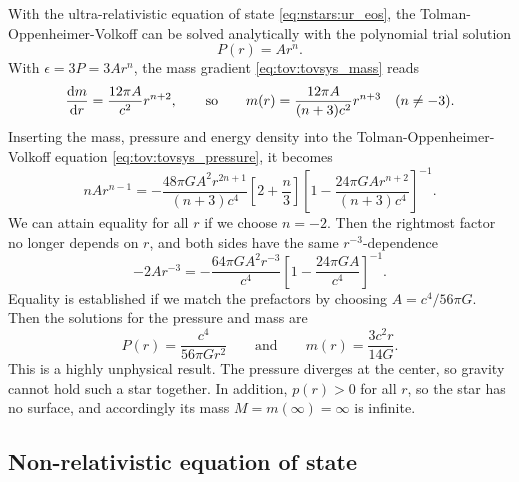 With the ultra-relativistic equation of state \eqref{eq:nstars:ur_eos}, the Tolman-Oppenheimer-Volkoff can be solved analytically with the polynomial trial solution
\begin{equation}
	P(r) = A r^n .
\label{eq:nstars:ur_ansatz}
\end{equation}
With $\epsilon = 3 P = 3 A r^n$, the mass gradient \eqref{eq:tov:tovsys_mass} reads
\begin{equation}
	\odv{m}{r} = \frac{12 \pi A}{c^2} r^{n+2},
	\qquad \text{so} \qquad
	m(r) = \frac{12 \pi A}{(n+3) c^2} r^{n+3}
	\quad (n \neq -3).
\label{eq:nstars:ur_mass}
\end{equation}
Inserting the mass, pressure and energy density into the Tolman-Oppenheimer-Volkoff equation \eqref{eq:tov:tovsys_pressure}, it becomes
\begin{equation}
	n A r^{n-1} =
	-\frac{48 \pi G A^2 r^{2n+1}}{(n+3) c^4} \left[ 2 + \frac{n}{3} \right] \left[ 1 - \frac{24 \pi G A r^{n+2}}{(n+3) c^4} \right]^{-1} .
\end{equation}
We can attain equality for all $r$ if we choose $n = -2$.
Then the rightmost factor no longer depends on $r$, and both sides have the same $r^{-3}$-dependence
\begin{equation}
	- 2 A r^{-3} = - \frac{64 \pi G A^2 r^{-3}}{c^4} \left[ 1 - \frac{24 \pi G A}{c^4} \right]^{-1} .
\end{equation}
Equality is established if we match the prefactors by choosing $A = c^4 / 56 \pi G$.
Then the solutions for the pressure and mass are
\begin{equation}
	P(r) = \frac{c^4}{56 \pi G r^2}
	\qquad \text{and} \qquad
	m(r) = \frac{3 c^2 r}{14 G} .
\end{equation}
This is a highly unphysical result.
The pressure diverges at the center, so gravity cannot hold such a star together.
In addition, $p(r) > 0$ for all $r$, so the star has no surface, and accordingly its mass $M = m(\infty) = \infty$ is infinite.

\subsection{Non-relativistic equation of state}
\label{sec:nstars:nr_limit_solve}

